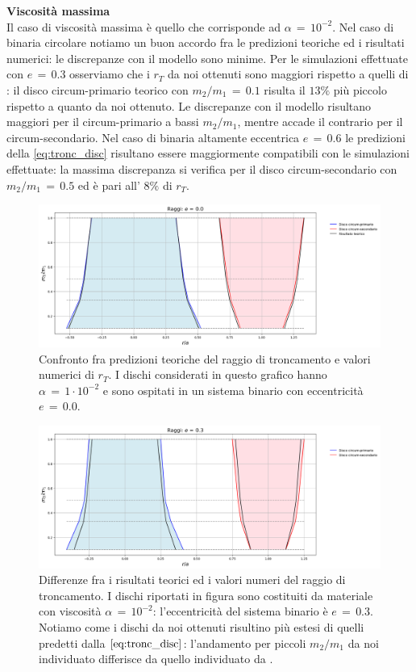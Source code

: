 \textbf{Viscosità massima}\\

Il caso di viscosità massima è quello che corrisponde ad $\alpha\,=\,10^{-2}$. 
Nel caso di binaria circolare notiamo un buon accordo fra le predizioni teoriche ed i risultati numerici: le discrepanze con il modello sono minime.
Per le simulazioni effettuate con $e\,=\,0.3$ osserviamo che i $r_T$ da noi ottenuti sono maggiori rispetto a quelli di \textcite{ManaraTronc2019}: il disco circum-primario teorico con $m_2/m_1\,=\,0.1$ risulta il $13\%$ più piccolo rispetto a quanto da noi ottenuto.
Le discrepanze con il modello risultano maggiori per il circum-primario a bassi $m_2/m_1$, mentre accade il contrario per il circum-secondario.
Nel caso di binaria altamente eccentrica $e\,=\,0.6$ le predizioni della \eqref{eq:tronc_disc} risultano essere maggiormente compatibili con le simulazioni effettuate: la massima discrepanza si verifica per il disco circum-secondario con $m_2/m_1\,=\,0.5$ ed è pari all' $8\%$ di $r_T$.
\begin{figure}[H]
  \centering
  \includegraphics[width=\textwidth]{Immagini/Confronto/conrag_A2_e0.png}
  \caption{Confronto fra predizioni teoriche del raggio di troncamento e valori numerici di $r_T$. I dischi considerati in questo grafico hanno $\alpha\,=\,1 \cdot 10^{-2}$ e sono ospitati in un sistema binario con eccentricità $e\,=\,0.0$. }
  \label{fig:conf_rag20}
\end{figure}

\begin{figure}[H]
  \centering
  \includegraphics[width=\textwidth]{Immagini/Confronto/conrag_A2_e3.png}
  \caption{Differenze fra i risultati teorici ed i valori numeri del raggio di troncamento. I dischi riportati in figura sono costituiti da materiale con viscosità $\alpha\,=\,10^{-2}$: l'eccentricità del sistema binario è $e\,=\,0.3$. Notiamo come i dischi da noi ottenuti risultino più estesi di quelli predetti dalla $\eqref{eq:tronc_disc}$: l'andamento per piccoli $m_2/m_1$ da noi individuato differisce da quello individuato da \textcite{ManaraTronc2019}.}
  \label{fig:conf_rag23}
\end{figure}

